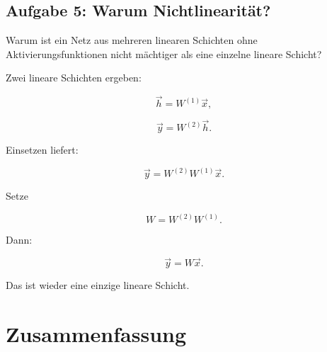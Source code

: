 \subsection{Aufgabe 5: Warum Nichtlinearität?}

Warum ist ein Netz aus mehreren linearen Schichten ohne Aktivierungsfunktionen nicht mächtiger als eine einzelne lineare Schicht?

\begin{examplebox}
Zwei lineare Schichten ergeben:

\[
    \vec{h}=W^{(1)}\vec{x},
\]

\[
    \vec{y}=W^{(2)}\vec{h}.
\]

Einsetzen liefert:

\[
    \vec{y}=W^{(2)}W^{(1)}\vec{x}.
\]

Setze

\[
    W=W^{(2)}W^{(1)}.
\]

Dann:

\[
    \vec{y}=W\vec{x}.
\]

Das ist wieder eine einzige lineare Schicht.
\end{examplebox}

\section{Zusammenfassung}

